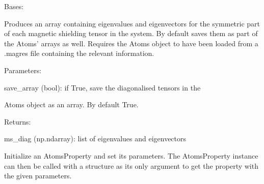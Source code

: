 \documentclass[letterpaper,10pt,english]{sphinxmanual}
\begin{document}
\begin{fulllineitems}
\label{doctree/soprano.properties.nmr.ms:soprano.properties.nmr.ms.MSDiagonal}
Bases: {\hyperref[doctree/soprano.properties.atomsproperty:soprano.properties.atomsproperty.AtomsProperty]{\emph{}}}

Produces an array containing eigenvalues and eigenvectors for the
symmetric part of each magnetic shielding tensor in the system. By default
saves them as part of the Atoms' arrays as well.
Requires the Atoms object to have been loaded from a .magres file
containing the relevant information.

\begin{DUlineblock}{0em}
\item[] Parameters:
\item[]
\begin{DUlineblock}{\DUlineblockindent}
\item[] save\_array (bool): if True, save the diagonalised tensors in the
\item[]
\begin{DUlineblock}{\DUlineblockindent}
\item[] Atoms object as an array. By default True.
\end{DUlineblock}
\end{DUlineblock}
\end{DUlineblock}

\begin{DUlineblock}{0em}
\item[] Returns:
\item[]
\begin{DUlineblock}{\DUlineblockindent}
\item[] ms\_diag (np.ndarray): list of eigenvalues and eigenvectors
\end{DUlineblock}
\end{DUlineblock}

Initialize an AtomsProperty and set its parameters.
The AtomsProperty instance can then be called with a structure as its
only argument to get the property with the given parameters.


\end{fulllineitems}
\end{document}
